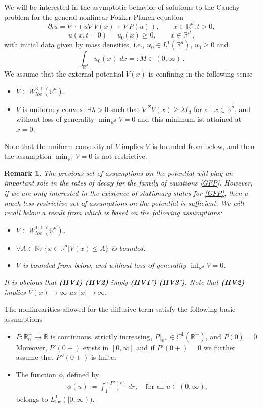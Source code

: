 \documentclass[reqno]{amsart}
\newtheorem{remark}[lemma]{Remark}
\newcommand{\R}{\mathbb{R}}
\begin{document}
We will be interested in the asymptotic behavior of solutions to the Cauchy problem for the general nonlinear Fokker-Planck equation
\begin{equation}
    \partial_t u=\nabla\cdot (u \nabla V(x) +  \nabla P(u)),\qquad x\in \R^d, t>0,
\label{GFP}
\end{equation}
\begin{equation} u(x,t=0) = u_0(x) \geq 0 , \qquad x \in \R^d\,,
\label{GFP2}
\end{equation}
with initial data given by mass densities, i.e., $u_0\in L^1(\R^d)$, $u_0\ge0$ and 
$$
\int_{\R^d} u_0(x)\;dx =: M\in(0,\infty)\,.
$$
We assume that the external potential $V(x)$ is confining in the following sense
\begin{itemize}
\item[{\bf (HV1)}] $V\in W^{3,1}_{loc}(\R^d)$. 
\item[{\bf (HV2)}] $V$ is uniformly convex: $\exists\lambda>0$ such that $\nabla^2 V(x)\geq \lambda I_d$ for all $x\in\R^d$, and without loss of generality $\min_{\R^d} V=0$ and this minimum ist attained at $x=0$. 
\end{itemize}
Note that the uniform convexity of $V$ implies $V$ is bounded from below, and then the assumption $\min_{\R^d} V=0$ is not restrictive.
  
\begin{remark}\label{data1}
The previous set of assumptions on the potential will play an important role in the rates of decay for the family of equations \eqref{GFP}. However, if we are only interested in the existence of stationary states for \eqref{GFP}, then a much less restrictive set of assumptions on the potential is sufficient. We will recall below a result from \cite{CJMTU} which is based on the following assumptions:
\begin{itemize}
\item[{\bf (HV1')}] $V\in W^{1,1}_{loc}(\R^d)$.
\item[{\bf (HV2')}] $\forall A\in\R$: $\{x\in\R^d | V(x)\le A\}$ is
bounded. 
\item[{\bf (HV3')}] $V$ is bounded from below, and without loss of generality $\inf_{\R^d} V=0$. 
\end{itemize}
It is obvious that {\bf (HV1)}-{\bf (HV2)} imply {\bf (HV1')}-{\bf (HV3')}.
Note that {\bf (HV2)} implies $V(x)\to\infty$ as $|x|\to\infty$. 
\end{remark}

The nonlinearities allowed for the diffusive term satisfy the following basic assumptions
\begin{itemize}
\item[{\bf (HP1)}] $P:\R^+_0\!\to\!\R$ is continuous, strictly increasing, $P|_{\R
^+}\!\!\in C^1(\R^+)$, and $P(0)=0$. Moreover, $P'(0+)$ exists in $[0,\infty]$ and if $P'(0+)=0$ we further assume that $P''(0+)$ is finite.
\item[{\bf (HP2)}] The function $\phi$, defined by 
\begin{align}
    \label{eq:P2phi}    
    \phi(u) := \int_1^u \frac{P'(r)}{r}\;dr,\quad \text{for all $u\in(0,\infty)$},
\end{align}
belongs to $L^1_\text{loc}([0,\infty))$.
\end{itemize}
\end{document}
